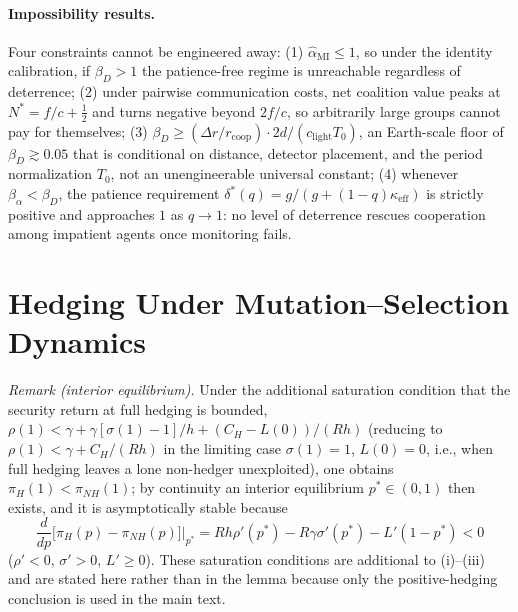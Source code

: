 \documentclass[manuscript,screen,review]{jair}
\begin{document}
\paragraph{Impossibility results.}
Four constraints cannot be engineered away: (1) $\hat\alpha_{\mathrm{MI}} \leq 1$, so under the identity calibration, if $\beta_D > 1$ the patience-free regime is unreachable regardless of deterrence; (2) under pairwise communication costs, net coalition value peaks at $N^* = f/c + \tfrac{1}{2}$ and turns negative beyond $2f/c$, so arbitrarily large groups cannot pay for themselves; (3) $\beta_D \geq (\Delta r/r_{\mathrm{coop}})\cdot 2d/(c_{\mathrm{light}} T_0)$, an Earth-scale floor of $\beta_D \gtrsim 0.05$ that is conditional on distance, detector placement, and the period normalization $T_0$, not an unengineerable universal constant; (4) whenever $\beta_\alpha < \beta_D$, the patience requirement $\delta^*(q) = g/(g+(1-q)\kappa_{\mathrm{eff}})$ is strictly positive and approaches $1$ as $q \to 1$: no level of deterrence rescues cooperation among impatient agents once monitoring fails.

\section{Hedging Under Mutation--Selection Dynamics}
\label{app:mutation}

\emph{Remark (interior equilibrium).} Under the additional saturation condition that the security return at full hedging is bounded, $\rho(1) < \gamma + \gamma[\sigma(1)-1]/h + (C_H - L(0))/(Rh)$ (reducing to $\rho(1) < \gamma + C_H/(Rh)$ in the limiting case $\sigma(1) = 1$, $L(0) = 0$, i.e., when full hedging leaves a lone non-hedger unexploited), one obtains $\pi_H(1)<\pi_{NH}(1)$; by continuity an interior equilibrium $p^*\in(0,1)$ then exists, and it is asymptotically stable because
\begin{equation*}
\frac{d}{dp}\bigl[\pi_H(p)-\pi_{NH}(p)\bigr]\Big|_{p^*} = Rh\rho'(p^*) - R\gamma\sigma'(p^*) - L'(1-p^*) < 0
\end{equation*}
($\rho'<0$, $\sigma'>0$, $L' \geq 0$). These saturation conditions are additional to (i)--(iii) and are stated here rather than in the lemma because only the positive-hedging conclusion is used in the main text.
\end{document}

